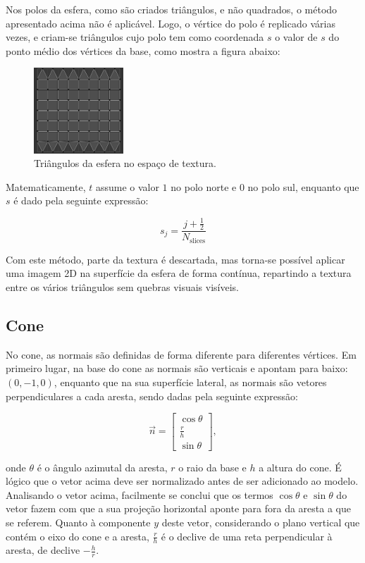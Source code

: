 \documentclass[12pt, a4paper]{article}
\begin{document}
Nos polos da esfera, como são criados triângulos, e não quadrados, o método apresentado acima não é
aplicável. Logo, o vértice do polo é replicado várias vezes, e criam-se triângulos cujo polo tem
como coordenada $s$ o valor de $s$ do ponto médio dos vértices da base, como mostra a figura abaixo:

\begin{figure}[H]
    \centering
    \includegraphics[width=0.3\textwidth]{res/phase4/SphereUV.png}
    \caption{Triângulos da esfera no espaço de textura.}
\end{figure}

Matematicamente, $t$ assume o valor $1$ no polo norte e $0$ no polo sul, enquanto que $s$ é dado
pela seguinte expressão:

$$
s_j = \frac{j + \frac{1}{2}}{N_\text{slices}}
$$

Com este método, parte da textura é descartada, mas torna-se possível aplicar uma imagem 2D na
superfície da esfera de forma contínua, repartindo a textura entre os vários triângulos sem quebras
visuais visíveis.

\subsection{Cone}

No cone, as normais são definidas de forma diferente para diferentes vértices. Em primeiro lugar, na
base do cone as normais são verticais e apontam para baixo: $(0, -1, 0)$, enquanto que na sua
superfície lateral, as normais são vetores perpendiculares a cada aresta, sendo dadas pela seguinte
expressão:

$$
\vec{n} =
\begin{bmatrix}
    \cos \theta \\
    \frac{r}{h} \\
    \sin \theta
\end{bmatrix},
$$

onde $\theta$ é o ângulo azimutal da aresta, $r$ o raio da base e $h$ a altura do cone. É lógico que
o vetor acima deve ser normalizado antes de ser adicionado ao modelo. Analisando o vetor acima,
facilmente se conclui que os termos $\cos \theta$ e $\sin \theta$ do vetor fazem com que a sua
projeção horizontal aponte para fora da aresta a que se referem. Quanto à componente $y$ deste
vetor, considerando o plano vertical que contém o eixo do cone e a aresta, $\frac{r}{h}$ é o declive
de uma reta perpendicular à aresta, de declive $-\frac{h}{r}$.
\end{document}

